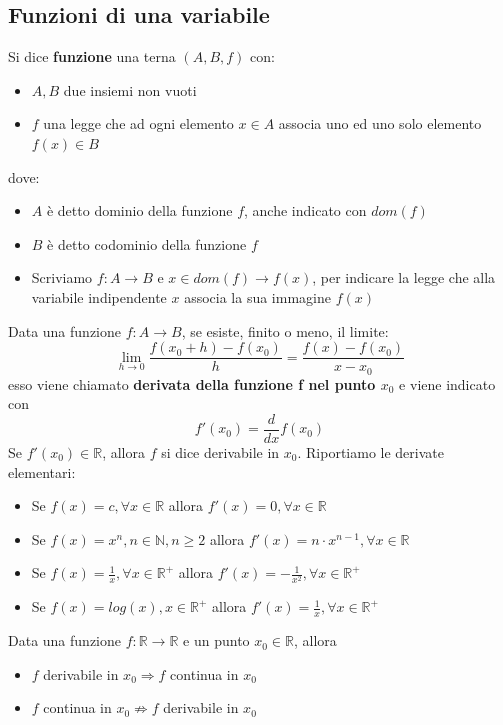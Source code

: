 \documentclass[12pt]{article}
\begin{document}
\subsection{Funzioni di una variabile}
Si dice \textbf{funzione} una terna $(A, B, f)$ con:
\begin{itemize}
    \item $A, B$ due insiemi non vuoti
    \item $f$ una legge che ad ogni elemento $x \in A$ associa uno ed uno solo elemento $f(x) \in B$
\end{itemize}
dove:
\begin{itemize}
    \item $A$ è detto dominio della funzione $f$, anche indicato con $dom(f)$
    \item $B$ è detto codominio della funzione $f$
    \item Scriviamo $f: A \rightarrow B$ e $x \in dom(f) \rightarrow f(x)$, per indicare la legge che alla variabile indipendente $x$ associa la sua immagine $f(x)$
\end{itemize}
Data una funzione $f: A \rightarrow B$, se esiste, finito o meno, il limite:
$$\lim_{h \rightarrow 0} \frac{f(x_0 + h) - f(x_0)}{h} = \frac{f(x) - f(x_0)}{x - x_0}$$
esso viene chiamato \textbf{derivata della funzione f nel punto $x_0$} e viene indicato con
$$f'(x_0) = \frac{d}{dx}f(x_0)$$
Se $f'(x_0) \in \mathbb{R}$, allora $f$ si dice derivabile in $x_0$. \newline
\newpage
Riportiamo le derivate elementari:
\begin{itemize}
    \item Se $f(x) = c, \forall x \in \mathbb{R}$ allora $f'(x) = 0, \forall x \in \mathbb{R}$
    \item Se $f(x) = x^n, n \in \mathbb{N}, n \geq 2$ allora $f'(x) = n \cdot x^{n-1}, \forall x \in \mathbb{R}$
    \item Se $f(x) = \frac{1}{x}, \forall x \in \mathbb{R}^+$ allora $f'(x) = -\frac{1}{x^2}, \forall x \in \mathbb{R}^+$
    \item Se $f(x) = log(x), x \in \mathbb{R}^+$ allora $f'(x) = \frac{1}{x}, \forall x \in \mathbb{R}^+$
\end{itemize}
Data una funzione $f: \mathbb{R} \rightarrow \mathbb{R}$ e un punto $x_0 \in \mathbb{R}$, allora
\begin{itemize}
    \item $f$ derivabile in $x_0 \Rightarrow f$ continua in $x_0$
    \item $f$ continua in $x_0 \not\Rightarrow f$ derivabile in $x_0$
\end{itemize}
\end{document}
